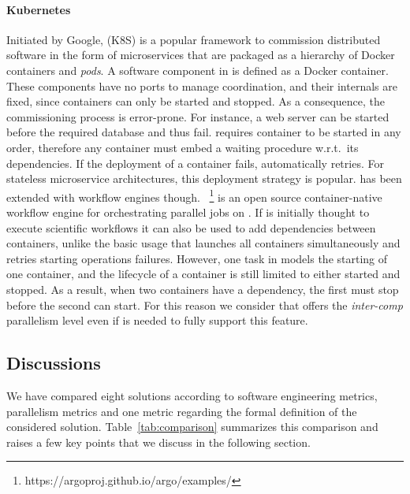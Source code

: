 \paragraph{Kubernetes}
Initiated by Google, \kubernetes (K8S) is a popular framework to
commission distributed software in the form of microservices that are
packaged as a hierarchy of Docker containers and \emph{pods}. A
software component in \kubernetes is defined as a Docker
container. These components have no ports to manage coordination, and
their internals are fixed, since containers can only be started and
stopped. As a consequence, the commissioning process is
error-prone. For instance, a web server can be started before the
required database and thus fail. 
\kubernetes requires
container to be started in any order, therefore any container must
embed a waiting procedure w.r.t.\ its dependencies. If the deployment of
a container fails, \kubernetes automatically retries. For stateless
microservice architectures, this deployment strategy is popular.
\kubernetes has been extended with workflow engines though. \argo~\footnote{https://argoproj.github.io/argo/examples/} is an open source container-native workflow engine for orchestrating parallel jobs on \kubernetes. If \argo is initially thought to execute scientific workflows it can also be used to add dependencies between containers, unlike the basic usage that launches all containers simultaneously and retries starting operations failures. However, one task in \argo models the starting of one container, and the lifecycle of a container is still limited to either started and stopped. As a result, when two containers have a dependency, the first must stop before the second can start. For this reason we consider that \kubernetes offers the \emph{inter-comp} parallelism level even if \argo is needed to fully support this feature.

\subsection{Discussions}

We have compared eight solutions according to software engineering metrics, parallelism metrics and one metric regarding the formal definition of the considered solution. Table~\ref{tab:comparison} summarizes this comparison and raises a few key points that we discuss in the following section.

